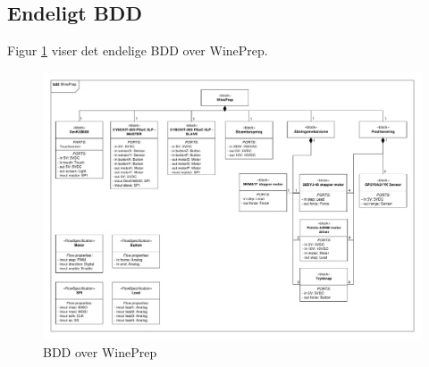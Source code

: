 \subsection{Endeligt BDD}
Figur \ref{BDD_WinePrepPDF} viser det endelige BDD over WinePrep. 

\begin{figure}[H]
	\centerline{\includegraphics[scale=0.4]{Diagrammer/BDD_WinePrep.pdf}}
	\caption{BDD over WinePrep}
	\label{BDD_WinePrepPDF}
\end{figure}

